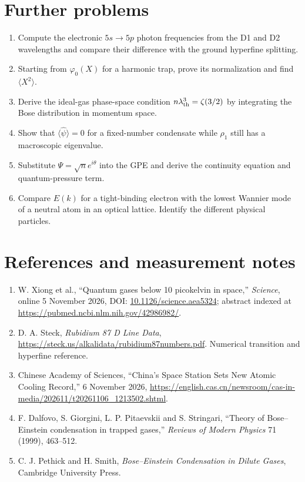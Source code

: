 \documentclass[11pt,a4paper]{article}
\newcommand{\ph}{\varphi}
\begin{document}
\section*{Further problems}
\begin{enumerate}[leftmargin=*]
\item Compute the electronic $5s\to5p$ photon frequencies from the D1 and D2 wavelengths and compare their difference with the ground hyperfine splitting.
\item Starting from $\ph_0(X)$ for a harmonic trap, prove its normalization and find $\langle X^2\rangle$.
\item Derive the ideal-gas phase-space condition $n\lambda_{\rm th}^3=\zeta(3/2)$ by integrating the Bose distribution in momentum space.
\item Show that $\langle\hat\psi\rangle=0$ for a fixed-number condensate while $\rho_1$ still has a macroscopic eigenvalue.
\item Substitute $\Psi=\sqrt{n}e^{i\theta}$ into the GPE and derive the continuity equation and quantum-pressure term.
\item Compare $E(k)$ for a tight-binding electron with the lowest Wannier mode of a neutral atom in an optical lattice. Identify the different physical particles.
\end{enumerate}

\section*{References and measurement notes}
\begingroup\sloppy
\begin{enumerate}[leftmargin=*]
\item W. Xiong et al., ``Quantum gases below 10 picokelvin in space,'' \emph{Science}, online 5 November 2026, DOI: \href{https://doi.org/10.1126/science.aea5324}{10.1126/science.aea5324}; abstract indexed at \url{https://pubmed.ncbi.nlm.nih.gov/42986982/}.
\item D. A. Steck, \emph{Rubidium 87 D Line Data}, \url{https://steck.us/alkalidata/rubidium87numbers.pdf}. Numerical transition and hyperfine reference.
\item Chinese Academy of Sciences, ``China's Space Station Sets New Atomic Cooling Record,'' 6 November 2026, \url{https://english.cas.cn/newsroom/cas-in-media/202611/t20261106_1213502.shtml}.
\item F. Dalfovo, S. Giorgini, L. P. Pitaevskii and S. Stringari, ``Theory of Bose--Einstein condensation in trapped gases,'' \emph{Reviews of Modern Physics} 71 (1999), 463--512.
\item C. J. Pethick and H. Smith, \emph{Bose--Einstein Condensation in Dilute Gases}, Cambridge University Press.
\end{enumerate}
\endgroup
\end{document}
